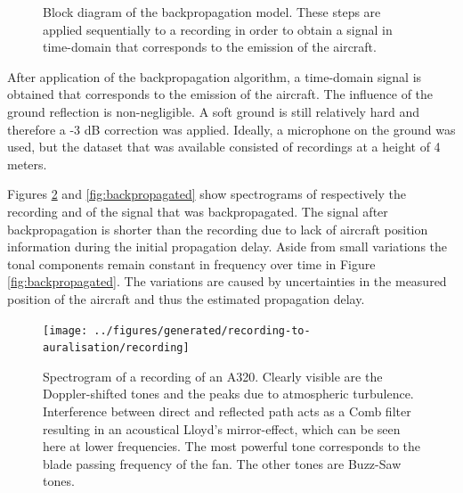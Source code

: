 \begin{figure}[H]
  \centering
{}
  \caption{Block diagram of the backpropagation model. These steps are applied sequentially to a recording in order to obtain a signal in time-domain that corresponds to the emission of the aircraft.}
  \label{fig:backpropagation_block_diagram}
\end{figure}

After application of the backpropagation algorithm, a time-domain signal is
obtained that corresponds to the emission of the aircraft. The influence of the
ground reflection is non-negligible. A soft ground is still relatively
hard and therefore a -3 dB correction was applied. Ideally, a microphone on the ground was used,
but the dataset that was available consisted of recordings at a height of 4 meters.

Figures \ref{fig:recording} and \ref{fig:backpropagated} show spectrograms of
respectively the recording and of the signal that was backpropagated. The signal
after backpropagation is shorter than the recording due to lack of aircraft
position information during the initial propagation delay.
Aside from small variations the tonal components remain constant in frequency
over time in Figure \ref{fig:backpropagated}. The variations are caused
by uncertainties in the measured position of the aircraft and thus the estimated
propagation delay.


\begin{figure}[H]
  \centering
  \texttt{[image: ../figures/generated/recording-to-auralisation/recording]}
  \caption{
    Spectrogram of a recording of an A320. Clearly visible are the
    Doppler-shifted tones and the peaks due to atmospheric turbulence.
    Interference between direct and reflected path acts as a Comb filter resulting
    in an acoustical Lloyd's mirror-effect, which can be seen here at lower
    frequencies. The most powerful tone corresponds to the blade passing frequency
    of the fan. The other tones are Buzz-Saw tones.}
  \label{fig:recording}
\end{figure}

